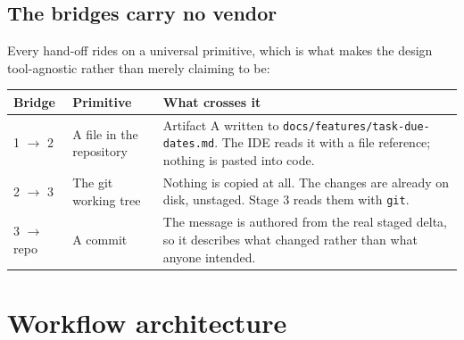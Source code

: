 \documentclass[11pt,a4paper]{article}
\newcommand{\code}[1]{\texttt{\small #1}}
\begin{document}
\subsection{The bridges carry no vendor}

Every hand-off rides on a universal primitive, which is what makes the design
tool-agnostic rather than merely claiming to be:

\begin{table}[h]
\centering
\small
\begin{tabularx}{\textwidth}{@{}l l X@{}}
\toprule
\textbf{Bridge} & \textbf{Primitive} & \textbf{What crosses it} \\
\midrule
1 $\rightarrow$ 2 & A file in the repository & Artifact A written to \code{docs/features/task-due-dates.md}. The IDE reads it with a file reference; nothing is pasted into code. \\
2 $\rightarrow$ 3 & The git working tree & Nothing is copied at all. The changes are already on disk, unstaged. Stage 3 reads them with \code{git}. \\
3 $\rightarrow$ repo & A commit & The message is authored from the real staged delta, so it describes what changed rather than what anyone intended. \\
\bottomrule
\end{tabularx}
\end{table}

\section{Workflow architecture}
\end{document}
